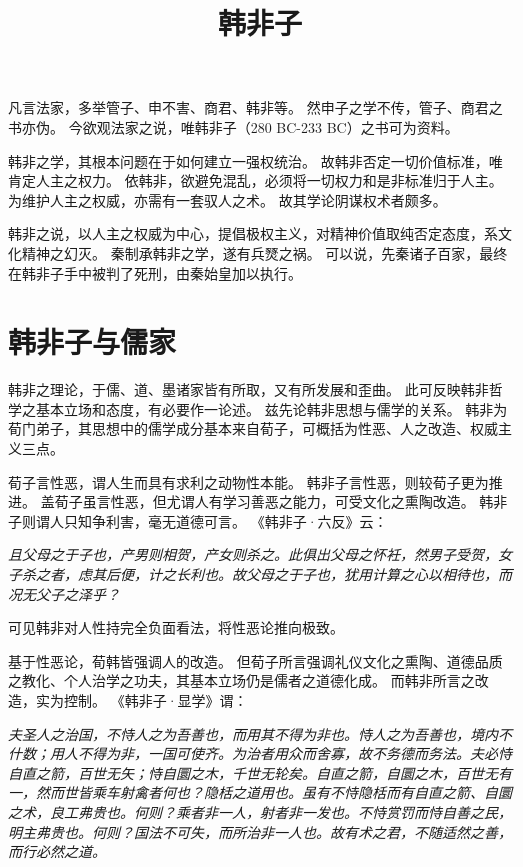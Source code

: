 \documentclass[11pt]{article}
\title{韩非子}
\date{}
\begin{document}
  \maketitle
  
  \linenumbers

凡言法家，多举管子、申不害、商君、韩非等。
然申子之学不传，管子、商君之书亦伪。
今欲观法家之说，唯韩非子（280 BC-233 BC）之书可为资料。

\par

韩非之学，其根本问题在于如何建立一强权统治。
故韩非否定一切价值标准，唯肯定人主之权力。
依韩非，欲避免混乱，必须将一切权力和是非标准归于人主。
为维护人主之权威，亦需有一套驭人之术。
故其学论阴谋权术者颇多。

\par

韩非之说，以人主之权威为中心，提倡极权主义，对精神价值取纯否定态度，系文化精神之幻灭。
秦制承韩非之学，遂有兵燹之祸。
可以说，先秦诸子百家，最终在韩非子手中被判了死刑，由秦始皇加以执行。
  
\section{韩非子与儒家}
韩非之理论，于儒、道、墨诸家皆有所取，又有所发展和歪曲。
此可反映韩非哲学之基本立场和态度，有必要作一论述。
兹先论韩非思想与儒学的关系。
韩非为荀门弟子，其思想中的儒学成分基本来自荀子，可概括为性恶、人之改造、权威主义三点。

\par

荀子言性恶，谓人生而具有求利之动物性本能。
韩非子言性恶，则较荀子更为推进。
盖荀子虽言性恶，但尤谓人有学习善恶之能力，可受文化之熏陶改造。
韩非子则谓人只知争利害，毫无道德可言。
《韩非子·六反》云：

\textit{且父母之于子也，产男则相贺，产女则杀之。此俱出父母之怀衽，然男子受贺，女子杀之者，虑其后便，计之长利也。故父母之于子也，犹用计算之心以相待也，而况无父子之泽乎？}
  
可见韩非对人性持完全负面看法，将性恶论推向极致。

\par

基于性恶论，荀韩皆强调人的改造。
但荀子所言强调礼仪文化之熏陶、道德品质之教化、个人治学之功夫，其基本立场仍是儒者之道德化成。
而韩非所言之改造，实为控制。
《韩非子·显学》谓：

\textit{夫圣人之治国，不恃人之为吾善也，而用其不得为非也。恃人之为吾善也，境内不什数；用人不得为非，一国可使齐。为治者用众而舍寡，故不务德而务法。夫必恃自直之箭，百世无矢；恃自圜之木，千世无轮矣。自直之箭，自圜之木，百世无有一，然而世皆乘车射禽者何也？隐栝之道用也。虽有不恃隐栝而有自直之箭、自圜之术，良工弗贵也。何则？乘者非一人，射者非一发也。不恃赏罚而恃自善之民，明主弗贵也。何则？国法不可失，而所治非一人也。故有术之君，不随适然之善，而行必然之道。}
\end{document}
